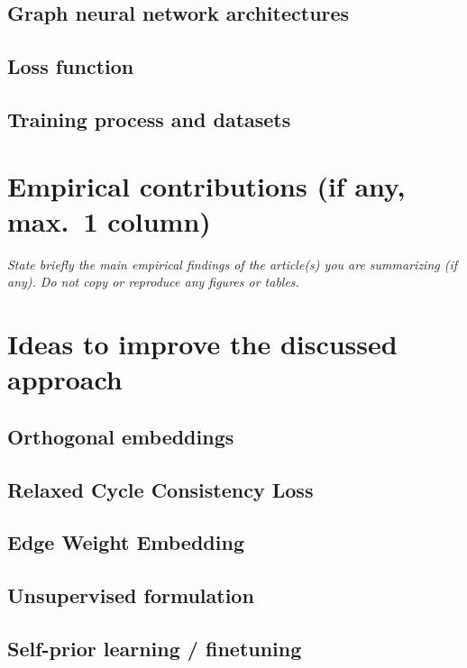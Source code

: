 \documentclass[10pt, twocolumn, a4paper]{article}
\theoremstyle{definition}
\begin{document}
\subsection{Graph neural network architectures}

\subsection{Loss function}

\subsection{Training process and datasets}

\section{Empirical contributions (if any, max.~1 column)}

\emph{State briefly the main empirical findings of the article(s) you are summarizing (if any).
    Do not copy or reproduce any figures or tables.}

\section{Ideas to improve the discussed approach}
\subsection{Orthogonal embeddings} \label{sec:ortho_emb}
\subsection{Relaxed Cycle Consistency Loss}
\subsection{Edge Weight Embedding}

\subsection{Unsupervised formulation}
\subsection{Self-prior learning / finetuning}



\end{document}
